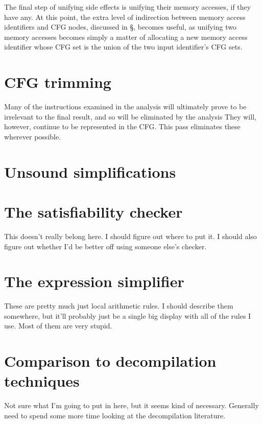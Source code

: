 
The final step of unifying side effects is unifying their memory
accesses, if they have any.  At this point, the extra level of
indirection between memory access identifiers and CFG nodes, discussed
in \S{}, becomes useful, as unifying two memory accesses
becomes simply a matter of allocating a new memory access identifier
whose CFG set is the union of the two input identifier's CFG
sets.

\section{CFG trimming}

Many of the instructions examined in the analysis will ultimately prove to be irrelevant to the final result, and so will be eliminated by the analysis
They will, however, continue to be represented in the \StateMachine CFG.
This pass eliminates these wherever possible.


\section{Unsound simplifications}

\section{The satisfiability checker}
This doesn't really belong here.  I should figure out where to put it.  I should also figure out whether I'd be better off using someone else's checker.

\section{The expression simplifier}
These are pretty much just local arithmetic rules.
I should describe them somewhere, but it'll probably just be a single big display with all of the rules I use.
Most of them are very stupid.

\section{Comparison to decompilation techniques}
Not sure what I'm going to put in here, but it seems kind of necessary.
Generally need to spend some more time looking at the decompilation literature.


